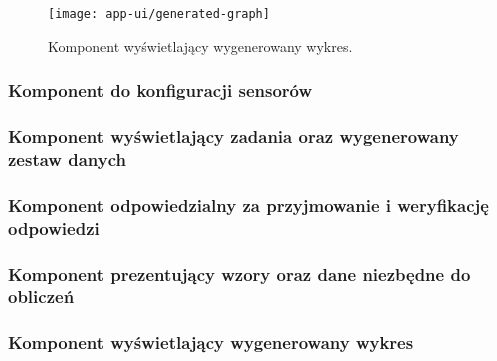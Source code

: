 \begin{figure}[!htbp]
  \centering
  \texttt{[image: app-ui/generated-graph]}
  \caption{\label{img:generated-graph}Komponent wyświetlający wygenerowany wykres.}
\end{figure}
\endgroup

\subsubsection{Komponent do konfiguracji sensorów}


\subsubsection{Komponent wyświetlający zadania oraz wygenerowany zestaw danych}



\subsubsection{Komponent odpowiedzialny za przyjmowanie i weryfikację odpowiedzi}



\subsubsection{Komponent prezentujący wzory oraz dane niezbędne do obliczeń}



\subsubsection{Komponent wyświetlający wygenerowany wykres}

